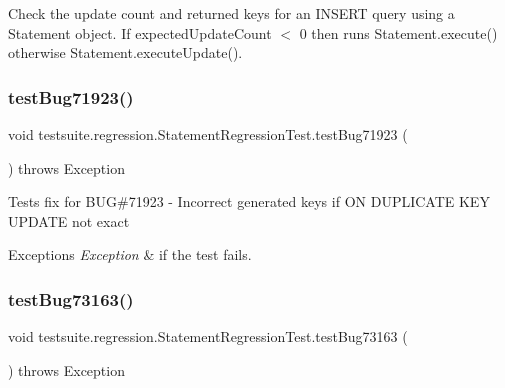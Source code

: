 Check the update count and returned keys for an I\+N\+S\+E\+RT query using a Statement object. If expected\+Update\+Count $<$ 0 then runs Statement.\+execute() otherwise Statement.\+execute\+Update(). \mbox{\label{classtestsuite_1_1regression_1_1_statement_regression_test_a3676f906ace9714006ad7a71ab1e4211}} 
\subsubsection{\texorpdfstring{test\+Bug71923()}{testBug71923()}}
{\footnotesize\ttfamily void testsuite.\+regression.\+Statement\+Regression\+Test.\+test\+Bug71923 (\begin{DoxyParamCaption}{ }\end{DoxyParamCaption}) throws Exception}

Tests fix for B\+UG\#71923 -\/ Incorrect generated keys if ON D\+U\+P\+L\+I\+C\+A\+TE K\+EY U\+P\+D\+A\+TE not exact


\begin{DoxyExceptions}{Exceptions}
{\em Exception} & if the test fails. \\
\hline
\end{DoxyExceptions}
\mbox{\label{classtestsuite_1_1regression_1_1_statement_regression_test_ae5f07756a16c505fbd7fb497fcf9f601}} 
\subsubsection{\texorpdfstring{test\+Bug73163()}{testBug73163()}}
{\footnotesize\ttfamily void testsuite.\+regression.\+Statement\+Regression\+Test.\+test\+Bug73163 (\begin{DoxyParamCaption}{ }\end{DoxyParamCaption}) throws Exception}

